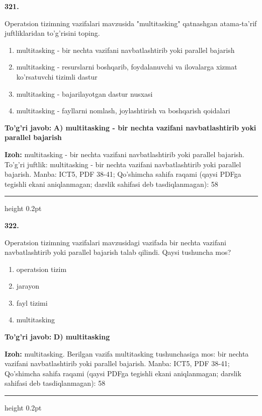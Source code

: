 \documentclass[10pt,a4paper]{article}
\begin{document}
{\bfseries\sffamily\color{ink} 321.}
\par
Operatsion tizimning vazifalari mavzusida "multitasking" qatnashgan atama-ta'rif juftliklaridan to'g'risini toping.
\begin{enumerate}[label=\Alph*),leftmargin=9mm]
\item multitasking - bir nechta vazifani navbatlashtirib yoki parallel bajarish
\item multitasking - resurslarni boshqarib, foydalanuvchi va ilovalarga xizmat ko'rsatuvchi tizimli dastur
\item multitasking - bajarilayotgan dastur nusxasi
\item multitasking - fayllarni nomlash, joylashtirish va boshqarish qoidalari
\end{enumerate}
\begin{tcolorbox}[enhanced,breakable,colback=teal!4,colframe=teal!60!black,boxrule=0.45pt,arc=1.2mm,left=2.7mm,right=2.7mm,top=1.8mm,bottom=1.8mm,before skip=2mm,after skip=2mm]
{\bfseries\sffamily\color{teal}To'g'ri javob:} \textbf{A) multitasking - bir nechta vazifani navbatlashtirib yoki parallel bajarish}
\par\smallskip
{\bfseries Izoh:} multitasking - bir nechta vazifani navbatlashtirib yoki parallel bajarish. To'g'ri juftlik: multitasking - bir nechta vazifani navbatlashtirib yoki parallel bajarish. Manba: ICT5, PDF 38-41; Qo'shimcha sahifa raqami (qaysi PDFga tegishli ekani aniqlanmagan; darslik sahifasi deb tasdiqlanmagan): 58
\end{tcolorbox}
\vspace{2mm}\hrule height 0.2pt\vspace{3mm}

{\bfseries\sffamily\color{ink} 322.}
\par
Operatsion tizimning vazifalari mavzusidagi vazifada bir nechta vazifani navbatlashtirib yoki parallel bajarish talab qilindi. Qaysi tushuncha mos?
\begin{enumerate}[label=\Alph*),leftmargin=9mm]
\item operatsion tizim
\item jarayon
\item fayl tizimi
\item multitasking
\end{enumerate}
\begin{tcolorbox}[enhanced,breakable,colback=teal!4,colframe=teal!60!black,boxrule=0.45pt,arc=1.2mm,left=2.7mm,right=2.7mm,top=1.8mm,bottom=1.8mm,before skip=2mm,after skip=2mm]
{\bfseries\sffamily\color{teal}To'g'ri javob:} \textbf{D) multitasking}
\par\smallskip
{\bfseries Izoh:} multitasking. Berilgan vazifa multitasking tushunchasiga mos: bir nechta vazifani navbatlashtirib yoki parallel bajarish. Manba: ICT5, PDF 38-41; Qo'shimcha sahifa raqami (qaysi PDFga tegishli ekani aniqlanmagan; darslik sahifasi deb tasdiqlanmagan): 58
\end{tcolorbox}
\vspace{2mm}\hrule height 0.2pt\vspace{3mm}
\end{document}
